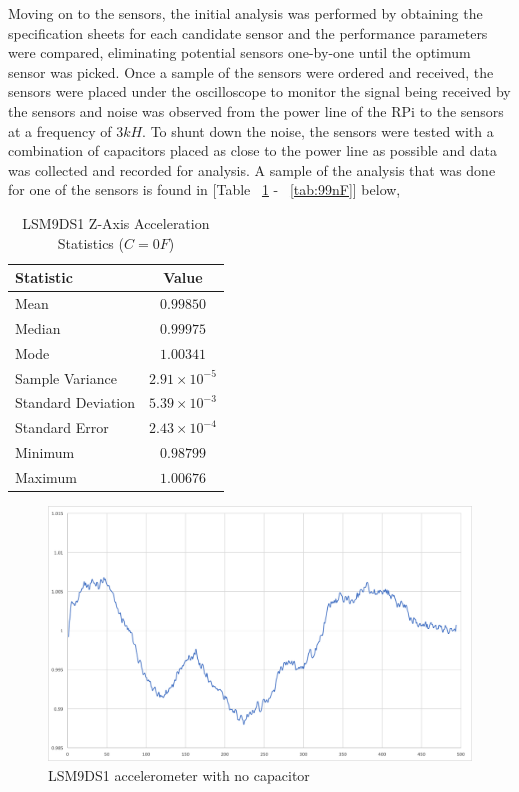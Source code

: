 \indent\indent Moving on to the sensors, the initial analysis was performed by obtaining the specification sheets for each candidate sensor and the performance parameters were compared, eliminating potential sensors one-by-one until the optimum sensor was picked. Once a sample of the sensors were ordered and received, the sensors were placed under the oscilloscope to monitor the signal being received by the sensors and noise was observed from the power line of the RPi to the sensors at a frequency of $3kH$. To shunt down the noise, the sensors were tested with a combination of capacitors placed as close to the power line as possible and data was collected and recorded for analysis. A sample of the analysis that was done for one of the sensors is found in [Table ~\ref{tab:no_cap} - ~\ref{tab:99nF}] below,

\begin{table}[H]
\caption{\label{tab:no_cap} LSM9DS1 Z-Axis Acceleration Statistics ($C=0F$)}
\centering
\begin{tabular}{l|c}
\hline\hline
\textbf{Statistic}      & \textbf{Value}            \\\hline
Mean                    & $0.99850$                 \\\hline
Median                  & $0.99975$                 \\\hline
Mode  	                & $1.00341$                 \\\hline
Sample Variance         & $2.91\times10^{\minus5}$  \\\hline
Standard Deviation      & $5.39\times10^{\minus3}$  \\\hline
Standard Error  	    & $2.43\times10^{\minus4}$  \\\hline
Minimum                 & $0.98799$                 \\\hline
Maximum                 & $1.00676$                 \\\hline
\end{tabular}
\end{table}

\begin{figure}[ht]
  \centering
  \includegraphics[width=1.0\textwidth]{Controls/no_cap.png}
  \caption{\label{fig:no_cap} LSM9DS1 accelerometer with no capacitor}
\end{figure}

